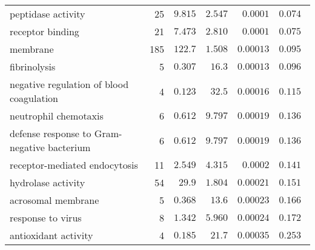 \begin{longtable}{|l|r|r|r|r|r|}
    peptidase activity                                    & 25                      & $ 9.815$                & $ 2.547$   & $0.0001$             & $ 0.074~~$                      \\
    receptor binding                                      & 21                      & $ 7.473$                & $ 2.810$   & $0.0001$             & $ 0.075~~$                      \\
    membrane                                              & 185                     & $ 122.7$                & $ 1.508$   & $0.00013$            & $ 0.095~~$                      \\
    fibrinolysis                                          & 5                       & $ 0.307$                & $  16.3$     & $0.00013$            & $ 0.096~~$                      \\
    negative regulation of blood coagulation              & 4                       & $ 0.123$                & $  32.5$     & $0.00016$            & $ 0.115~~$                      \\
    neutrophil chemotaxis                                 & 6                       & $ 0.612$                & $ 9.797$   & $0.00019$            & $ 0.136~~$                      \\
    defense response to Gram-negative bacterium           & 6                       & $ 0.612$                & $ 9.797$   & $0.00019$            & $ 0.136~~$                      \\
    receptor-mediated endocytosis                         & 11                      & $ 2.549$                & $ 4.315$   & $0.0002$             & $ 0.141~~$                      \\
    hydrolase activity                                    & 54                      & $  29.9$                  & $ 1.804$   & $0.00021$            & $ 0.151~~$                      \\
    acrosomal membrane                                    & 5                       & $ 0.368$                & $  13.6$     & $0.00023$            & $ 0.166~~$                      \\
    response to virus                                     & 8                       & $ 1.342$                & $ 5.960$   & $0.00024$            & $ 0.172~~$                      \\
    antioxidant activity                                  & 4                       & $ 0.185$                & $  21.7$     & $0.00035$            & $ 0.253~~$                      \\

\end{longtable}
